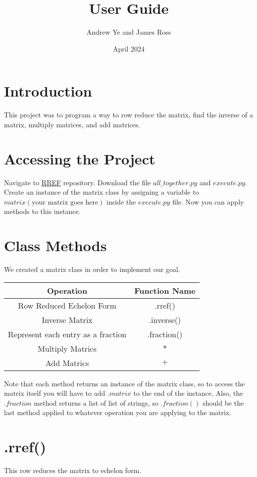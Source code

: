 \documentclass{article}
\title{User Guide}
\author{Andrew Ye and James Ross}
\date{April 2024}
\begin{document}
\maketitle
\newpage
\tableofcontents
\newpage

\section{Introduction}
This project was to program a way to row reduce the matrix, find the inverse of a matrix, multiply matrices, and add matrices. 

\section{Accessing the Project}
Navigate to \href{https://github.com/AndrewYe12/RREF/blob/main/all_together.py}{RREF} repository. Download the file \(all\_together.py\) and \(execute.py\). 
Create an instance of the matrix class by assigning a variable to \(matrix(\text{your matrix goes here})\) inside the \(execute.py\) file. Now you can apply methods to this instance.


\section{Class Methods}
We created a matrix class in order to implement our goal.
\begin{center}
\begin{tabular}{||c|c||}
    \hline
    Operation & Function Name \\ [0.5ex]
    \hline\hline
    Row Reduced Echelon Form & .rref() \\
    Inverse Matrix & .inverse() \\
    Represent each entry as a fraction & .fraction() \\
    Multiply Matrics & \(*\) \\
    Add Matrics & \(+\) \\ [1ex]
    \hline 
\end{tabular}
\end{center}
Note that each method returns an instance of the matrix class, so to access the matrix itself you will have to add \(.matrix\) to the end of the instance. 
Also, the \(.fraction\) method returns a list of list of strings, so \(.fraction()\) should be the last method applied to whatever operation you are applying to the
matrix. 

\section{.rref()}
This  row reduces the matrix to echelon form. 
\end{document}
